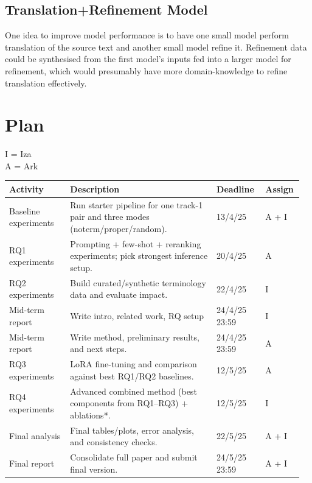 \documentclass[11pt]{article}
\begin{document}
\subsection{Translation+Refinement Model}
One idea to improve model performance is to have one small model perform translation of the source text and another small model refine it. Refinement data could be synthesised from the first model's inputs fed into a larger model for refinement, which would presumably have more domain-knowledge to refine translation effectively.


\section{Plan}
I = Iza \\
A = Ark

\begin{table}[h]
\centering
\begin{tabular}{|p{0.20\linewidth}|p{0.48\linewidth}|p{0.16\linewidth}|p{0.12\linewidth}|}
\hline
\textbf{Activity} & \textbf{Description} & \textbf{Deadline} & \textbf{Assign} \\ \hline
Baseline experiments & Run starter pipeline for one track-1 pair and three modes (noterm/proper/random). & 13/4/25 &  A + I \\ \hline
RQ1 experiments & Prompting + few-shot + reranking experiments; pick strongest inference setup. & 20/4/25 &  A \\ \hline
RQ2 experiments & Build curated/synthetic terminology data and evaluate impact. & 22/4/25 &  I \\ \hline
Mid-term report & Write intro, related work, RQ setup & 24/4/25 23:59 & I \\ \hline
Mid-term report & Write method, preliminary results, and next steps. & 24/4/25 23:59 &  A \\ \hline
RQ3 experiments & LoRA fine-tuning and comparison against best RQ1/RQ2 baselines. & 12/5/25 &  A \\ \hline
RQ4 experiments & Advanced combined method (best components from RQ1--RQ3) + ablations*. & 12/5/25 &  I \\ \hline
Final analysis & Final tables/plots, error analysis, and consistency checks. & 22/5/25 &  A +  I \\ \hline
Final report & Consolidate full paper and submit final version. & 24/5/25 23:59 &  A +  I \\ \hline
\end{tabular}
\end{table}
\end{document}

